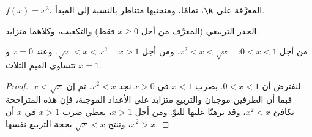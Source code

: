 \begin{proposition}\label{prop:g10:reffunc:cube}
 $f(x) = x^3$، المعرَّفة على $\R$،  تمامًا،
ومنحنيها متناظر بالنسبة إلى المبدأ.
\end{proposition}
\admitted

\begin{omfigure}
\hfill
{}

{\small الجذر التربيعي (المعرَّف من أجل $x \geq 0$ فقط) والتكعيب، وكلاهما
متزايد.}
\end{omfigure}

\begin{proposition}\label{prop:g10:reffunc:compare}
من أجل $0 < x < 1$:\ \ $x^2 < x < \sqrt x$.\quad
ومن أجل $x > 1$:\ \ $\sqrt x < x < x^2$.\quad
وعند $x = 0$ و $x = 1$ تتساوى القيم الثلاث.
\end{proposition}

\begin{proof}
لنفترض أن $0 < x < 1$. بضرب $x < 1$ في $x > 0$ نجد $x^2 < x$.
ثم إن $x < \sqrt x$: فبما أن الطرفين موجبان والتربيع
متزايد على الأعداد الموجبة، فإن هذه المتراجحة تكافئ
$x^2 < x$، وقد برهنّا عليها للتوّ. ومن أجل $x > 1$، يعطي ضرب $x > 1$ في $x$
أن $x^2 > x$، وتنتج $\sqrt x < x$ بحجة التربيع نفسها.
\end{proof}

